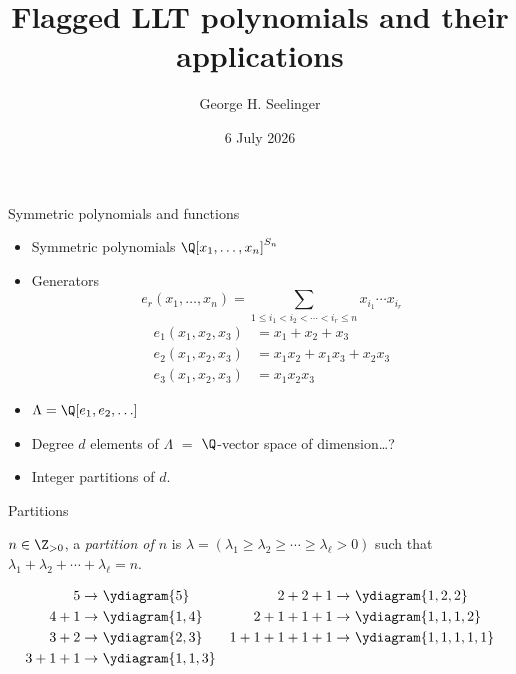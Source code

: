\documentclass[dvipsnames]{beamer}
\title[]{Flagged LLT polynomials and their applications} %
\author[George H. Seelinger]{George H. Seelinger} %
\institute[UMich] %
{
ghseeli@umich.edu\\ %
\medskip
joint work with Jonah Blasiak, Mark Haiman, Jennifer Morse, and Anna Pun\\
\medskip
Center for Mathematics at the University of Notre Dame \\ %
\medskip
Algebraic combinatorics and applications 
}
\date{6 July 2026} %
\theoremstyle{definition}
\newcounter{c}
\begin{document}
\begin{frame}
\titlepage %
\end{frame}
\begin{frame}{Symmetric polynomials and functions}
  \begin{itemize}
  \item Symmetric polynomials \(\Q[x_1,\ldots,x_n]^{S_n}\)
  \item Generators
    \[
       e_r(x_1,\ldots,x_n) = \sum_{1 \leq i_1 < i_2 <\cdots < i_r
      \leq n} x_{i_1} \cdots x_{i_r}
    \]
    \begin{align*}
      e_1(x_1,x_2,x_3) &= x_1 + x_2 + x_3  \\
      e_2(x_1,x_2,x_3) &= x_1 x_2 + x_1 x_3 + x_2 x_3\\
      e_3(x_1,x_2,x_3) &= x_1 x_2 x_3 
    \end{align*}
    \pause
  \item \(\Lambda = \Q[e_1,e_2,\ldots]\)\pause
  \item Degree \(d\) elements of \(\Lambda\) \(=\) \(\Q\)-vector
    space of dimension\ldots?\pause
  \item Integer partitions of \(d\).
  \end{itemize}
\end{frame}
\begin{frame}{Partitions}
    \begin{definition}
    \(n \in \Z_{>0}\), a \emph{partition of \(n\)} is
    \(\lambda = (\lambda_1 \geq
    \lambda_2 \geq \cdots \geq \lambda_\ell > 0)\) such that
    \(\lambda_1+\lambda_2 + \cdots + \lambda_\ell = n \).
  \end{definition}
  \begin{align*}
    5 \to &\ \ydiagram{5} & 
    2+2+1 \to&\ \ydiagram{1,2,2}\\
    4+1 \to &\ \ydiagram{1,4}&
    2+1+1+1 \to&\ \ydiagram{1,1,1,2} \\
    3+2 \to &\ \ydiagram{2,3}&
    1+1+1+1+1 \to&\ \ydiagram{1,1,1,1,1}\\
    3+1+1 \to &\ \ydiagram{1,1,3}
  \end{align*}
\end{frame}
\end{document}
